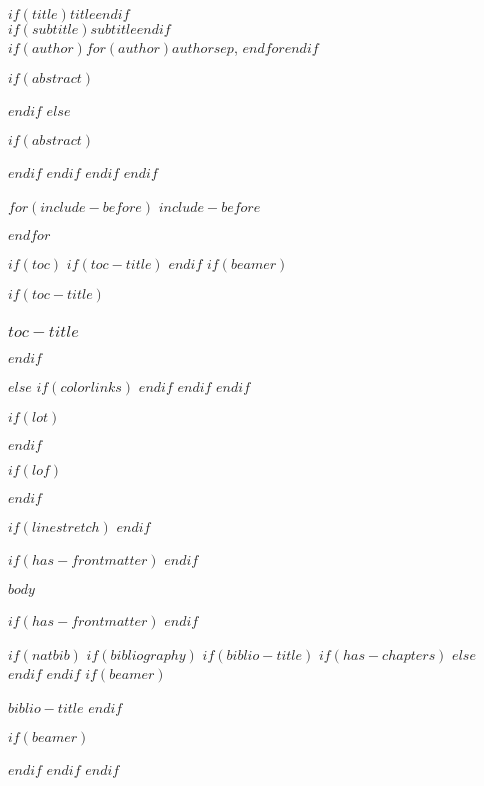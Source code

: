 \documentclass[
    $if(fontsize)$
      $fontsize$,
    $endif$
    $if(lang)$
      $babel-lang$,
    $endif$
    $if(papersize)$
      $papersize$paper,
    $endif$
    $if(beamer)$
        ignorenonframetext,
        $if(handout)$
          handout,
        $endif$
        $if(aspectratio)$
          aspectratio=$aspectratio$,
        $endif$
    $endif$
    $for(classoption)$
      $classoption$$sep$,
    $endfor$
]{$documentclass$}
\newif\ifbibliography
\begin{document}
            \begin{flushright}
                \textbf{$if(title)$$title$$endif$}\\
                \textit{$if(subtitle)$$subtitle$$endif$}\\
                $if(author)$$for(author)$$author$$sep$, $endfor$$endif$
            \end{flushright}
            $if(abstract)$
                \begin{abstract}
                $abstract$
                \end{abstract}
            $endif$
        $else$
            \maketitle
            $if(abstract)$
                \begin{abstract}
                $abstract$
                \end{abstract}
            $endif$
        $endif$
    $endif$
$endif$

$for(include-before)$
$include-before$

$endfor$

$if(toc)$
    $if(toc-title)$
        \renewcommand*\contentsname{$toc-title$}
    $endif$
    $if(beamer)$
        \begin{frame}[allowframebreaks]
            $if(toc-title)$
              \frametitle{$toc-title$}
            $endif$
            \tableofcontents[hideallsubsections]
        \end{frame}
    $else$
        {
        $if(colorlinks)$
        \hypersetup{linkcolor=$if(toccolor)$$toccolor$$else$$endif$}
        $endif$
        \setcounter{tocdepth}{$toc-depth$}
        \tableofcontents
        }
    $endif$
$endif$

$if(lot)$
\listoftables
$endif$

$if(lof)$
\listoffigures
$endif$

$if(linestretch)$
$endif$

$if(has-frontmatter)$
\mainmatter
$endif$

$body$

$if(has-frontmatter)$
\backmatter
$endif$

$if(natbib)$
    $if(bibliography)$
        $if(biblio-title)$
            $if(has-chapters)$
            \renewcommand\bibname{$biblio-title$}
            $else$
            \renewcommand\refname{$biblio-title$}
            $endif$
        $endif$
        $if(beamer)$
        \begin{frame}[allowframebreaks]{$biblio-title$}
          \bibliographytrue
        $endif$
        
        $if(beamer)$
        \end{frame}
        $endif$
    $endif$
$endif$
\end{document}
